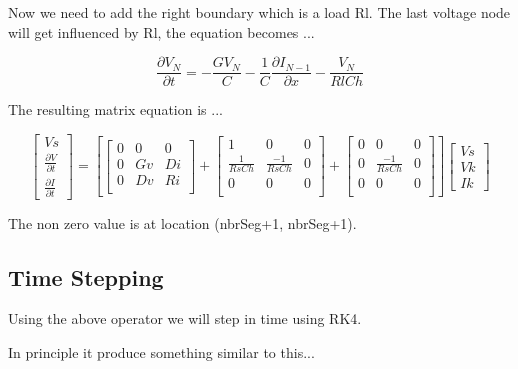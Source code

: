 \documentclass[12pt, letterpaper]{article}
\begin{document}
Now we need to add the right boundary which is a load Rl. The last voltage node will get influenced by Rl, the equation becomes ...

\begin{equation} \frac{\partial{V_N}}{\partial{t}} = -\frac{G V_N}{C} - \frac{1}{C} \frac{\partial{I_{N-1}}}{\partial{x}} - \frac{V_N}{Rl C h}
\end{equation}

The resulting matrix equation is ...


\begin{equation}
\begin{bmatrix}
	Vs \\
	\frac{\partial{V}}{\partial{t}} \\
	\frac{\partial{I}}{\partial{t}} 
\end{bmatrix}	
=
\left[ 
\begin{bmatrix}
	0 & 0 & 0 \\
	0 & Gv & Di \\
	0 & Dv & Ri \\
\end{bmatrix}
+
\begin{bmatrix}
	1 & 0 & 0 \\
	\frac{1}{Rs C h} & \frac{-1}{Rs C h} & 0 \\
	0 & 0 & 0 \\
\end{bmatrix}
+
\begin{bmatrix}
	0 & 0 & 0 \\
	0 & \frac{-1}{Rs C h} & 0 \\
	0 & 0 & 0 \\
\end{bmatrix}
\right]
\begin{bmatrix}
	Vs \\
	Vk \\
	Ik 
\end{bmatrix}
\end{equation}

The non zero value is at location (nbrSeg+1, nbrSeg+1).

\subsection{Time Stepping}

Using the above operator we will step in time using RK4.

In principle it produce something similar to this...
\end{document}
